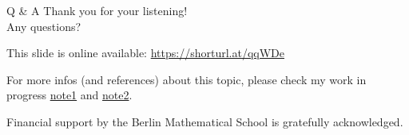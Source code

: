 \documentclass[pdf]{beamer}
\numberwithin{equation}{section}
\theoremstyle{plain}
\theoremstyle{plain}
\theoremstyle{remark}
\begin{document}
\begin{frame}[fragile]{Q \& A}
Thank you for your listening! 
\\[3mm]
Any questions?

\vspace{8mm}




This slide is online available:
\href{https://github.com/ramified/personal_tex_collection/raw/main/PhD_thesis_raw_data/talk_12min/Bologna_zxx_intro_to_Zchi.pdf}{https://shorturl.at/qqWDe}


For more infos (and references) about this topic, please check my work in progress \href{https://github.com/ramified/personal_tex_collection/blob/main/PhD_thesis_raw_data/dim_of_Zchi.pdf}{note1} and \href{https://github.com/ramified/personal_tex_collection/raw/main/PhD_thesis_raw_data/subvarieties/subvarieties_in_abelian_variety.pdf}{note2}.

\vspace{8mm}
Financial support by the Berlin Mathematical School is gratefully acknowledged.


\end{frame}
\end{document}
